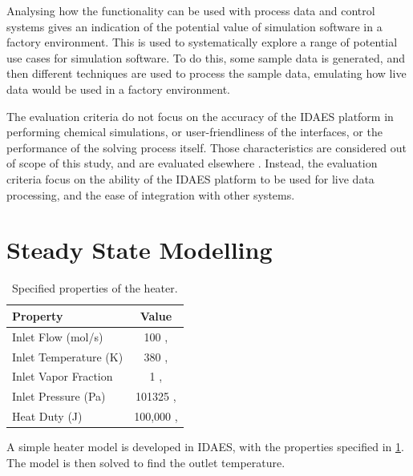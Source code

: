 \documentclass[12pt]{article}
\begin{document}
Analysing how the functionality can be used with process data and control systems gives an indication of the potential value of simulation software in a factory environment. This is used to systematically explore a range of potential use cases for simulation software. 
To do this, some sample data is generated, and then different techniques are used to process the sample data, emulating how live data would be used in a factory environment.

The evaluation criteria do not focus on the accuracy of the IDAES platform in performing chemical simulations, or user-friendliness of the interfaces, or the performance of the solving process itself. Those characteristics are considered out of scope of this study, and are evaluated elsewhere \cite{hart2011pyomo} \cite{myhre2022investigation}. Instead, the evaluation criteria focus on the ability of the IDAES platform to be used for live data processing, and the ease of integration with other systems.









\section{Steady State Modelling} \label{sec:steady_state}

\begin{table}[h]
    \centering
    \begin{tabular}{|l|c|}
        \hline
        \textbf{Property} & \textbf{Value} \\
        \hline
        Inlet Flow (mol/s) & 100 , \\
        \hline
        Inlet Temperature (K) & 380 , \\
        \hline
        Inlet Vapor Fraction & 1 ,  \\
        \hline
        Inlet Pressure (Pa) & 101325 ,  \\
        \hline
        Heat Duty (J) & 100,000 , \\
        \hline
    \end{tabular}
    \caption{Specified properties of the heater.}
    \label{tab:heater_properties}
\end{table}

A simple heater model is developed in IDAES, with the properties specified in \cref{tab:heater_properties}. The model is then solved to find the outlet temperature.
\end{document}

